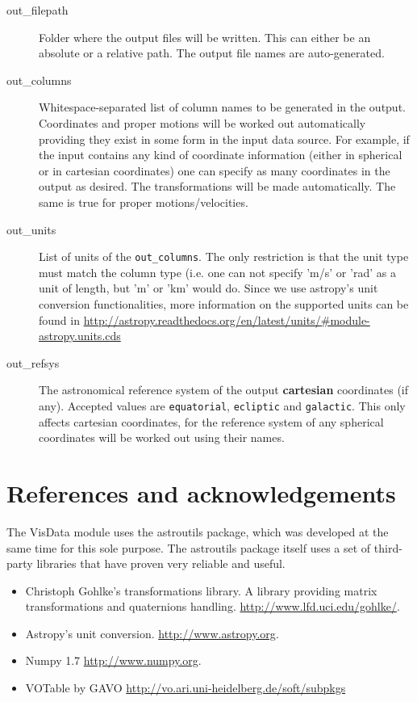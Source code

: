 \documentclass[
a4paper, %
11pt, %
onecolumn, %
openany, %
]{memoir}
\begin{document}
\begin{description}
\item[out\_filepath] Folder where the output files will be written. This can either be an absolute or a relative path. The output file names are auto-generated.
\item[out\_columns] Whitespace-separated list of column names to be generated in the output. Coordinates and proper motions will be worked out automatically 
providing they exist in some form in the input data source. For example, if the input contains any kind of coordinate information (either in spherical or in cartesian coordinates)
one can specify as many coordinates in the output as desired. The transformations will be made automatically. The same is true for proper motions/velocities.
\item[out\_units] List of units of the \texttt{out\_columns}. The only restriction is that the unit type must match the column type (i.e. one can not specify 'm/s' or 'rad' as a
unit of length, but 'm' or 'km' would do. Since we use astropy's unit conversion functionalities, more information on the supported units can be found in 
\href{http://astropy.readthedocs.org/en/latest/units/\#module-astropy.units.cds}{http://astropy.readthedocs.org/en/latest/units/\#module-astropy.units.cds}
\item[out\_refsys] The astronomical reference system of the output \textbf{cartesian} coordinates (if any). Accepted values are \texttt{equatorial}, \texttt{ecliptic} and \texttt{galactic}.
This only affects cartesian coordinates, for the reference system of any spherical coordinates will be
worked out using their names.
\end{description}

\section{References and acknowledgements}
The VisData module uses the astroutils package, which was developed at the same time for this sole purpose.
The astroutils package itself uses a set of third-party libraries that have proven very reliable and useful.
\begin{itemize}
\item Christoph Gohlke's transformations library. A library providing matrix transformations and quaternions handling. \href{http://www.lfd.uci.edu/gohlke/}{http://www.lfd.uci.edu/gohlke/}.
\item Astropy's unit conversion. \href{http://www.astropy.org}{http://www.astropy.org}.
\item Numpy 1.7 \href{http://www.numpy.org}{http://www.numpy.org}.
\item VOTable by GAVO \href{http://vo.ari.uni-heidelberg.de/soft/subpkgs}{http://vo.ari.uni-heidelberg.de/soft/subpkgs}
\end{itemize}
\end{document}
